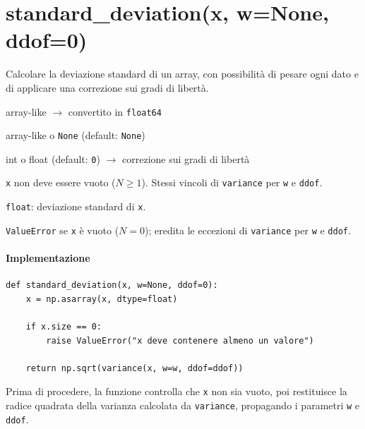 \section{\texorpdfstring{standard\_deviation(x, w=None, ddof=0)}{standard\_deviation(x, w=None, ddof=0)}}
\label{sec:standard-deviation}
\begin{apidesc}
  \item[\textbf{Scopo}]
    Calcolare la deviazione standard di un array, con possibilità di pesare ogni dato
    e di applicare una correzione sui gradi di libertà.
  \item[\textbf{Parametri}]\hfill
    \begin{description}[font=\normalfont\ttfamily\bfseries, labelwidth=2.5em, leftmargin=3em, itemsep=1pt, parsep=0pt, topsep=1pt]
      \item[x] array-like $\to$ convertito in \texttt{float64}
      \item[w] array-like o \texttt{None} (default: \texttt{None})
      \item[ddof] int o float (default: \texttt{0}) $\to$ correzione sui gradi di libertà
    \end{description}
  \item[\textbf{Vincoli}]
    \texttt{x} non deve essere vuoto ($N \geq 1$).
    Stessi vincoli di \texttt{variance} per \texttt{w} e \texttt{ddof}.
  \item[\textbf{Restituisce}]
    \texttt{float}: deviazione standard di \texttt{x}.
  \item[\textbf{Eccezioni}]
    \texttt{ValueError} se \texttt{x} è vuoto ($N = 0$);
    eredita le eccezioni di \texttt{variance} per \texttt{w} e \texttt{ddof}.
\end{apidesc}

\paragraph{Implementazione}
\begin{verbatim}
def standard_deviation(x, w=None, ddof=0):
    x = np.asarray(x, dtype=float)

    if x.size == 0:
        raise ValueError("x deve contenere almeno un valore")

    return np.sqrt(variance(x, w=w, ddof=ddof))
\end{verbatim}
Prima di procedere, la funzione controlla che \texttt{x} non sia vuoto,
poi restituisce la radice quadrata della varianza calcolata da \texttt{variance},
propagando i parametri \texttt{w} e \texttt{ddof}.

